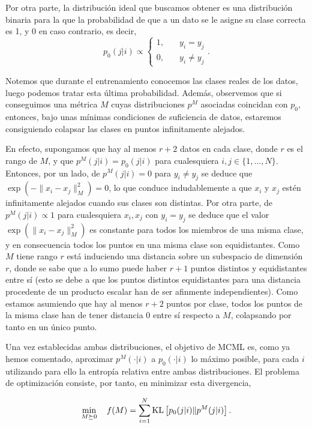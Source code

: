 \documentclass{book}
\begin{document}
Por otra parte, la distribución ideal que buscamos obtener es una distribución binaria para la que la probabilidad de que a un dato se le asigne su clase correcta es 1, y 0 en caso contrario, es decir,
\begin{equation}
	p_0(j|i) \propto \begin{cases}1, &\quad y_i = y_j \\ 0, &\quad y_i \ne y_j\end{cases}.
\end{equation}

Notemos que durante el entrenamiento conocemos las clases reales de los datos, luego podemos tratar esta última probabilidad. Además, observemos que si conseguimos una métrica $M$ cuyas distribuciones $p^M$ asociadas coincidan con $p_0$, entonces, bajo unas mínimas condiciones de suficiencia de datos, estaremos consiguiendo colapsar las clases en puntos infinitamente alejados. 

En efecto, supongamos que hay al menos $r + 2$ datos en cada clase, donde $r$ es el rango de $M$, y que $p^M(j|i) = p_0(j|i)$ para cualesquiera $i,j \in \{1,\dots,N\}$. Entonces, por un lado, de $p^M(j|i) = 0$ para $y_i \ne y_j$ se deduce que $\exp(-\|x_i-x_j\|^2_M) = 0$, lo que conduce indudablemente a que $x_i$ y $x_j$ estén infinitamente alejados cuando sus clases son distintas. Por otra parte, de $p^M(j|i) \propto 1$ para cualesquiera $x_i,x_j$ con $y_i = y_j$ se deduce que el valor $\exp(\|x_i-x_j\|_M^2)$ es constante para todos los miembros de una misma clase, y en consecuencia todos los puntos en una misma clase son equidistantes. Como $M$ tiene rango $r$ está induciendo una distancia sobre un subespacio de dimensión $r$, donde se sabe que a lo sumo puede haber $r+1$ puntos distintos y equidistantes entre sí (esto se debe a que los puntos distintos equidistantes para una distancia procedente de un producto escalar han de ser afinmente independientes). Como estamos asumiendo que hay al menos $r+2$ puntos por clase, todos los puntos de la misma clase han de tener distancia 0 entre sí respecto a $M$, colapsando por tanto en un único punto.

Una vez establecidas ambas distribuciones, el objetivo de MCML es, como ya hemos comentado, aproximar $p^M(\cdot|i)$ a $p_0(\cdot|i)$ lo máximo posible, para cada $i$ utilizando para ello la entropía relativa entre ambas distribuciones. El problema de optimización consiste, por tanto, en minimizar esta divergencia,

\begin{equation}
	\min_{M \succeq 0}\quad f(M) = \sum_{i=1}^N \operatorname{KL} \left[ p_0(j|i) \| p^M(j|i) \right].
\end{equation} 
\end{document}
